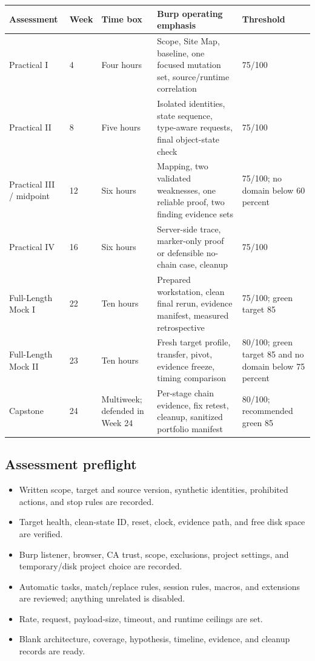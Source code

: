 \documentclass[11pt]{article}
\begin{document}
\begin{longtable}{@{}L{0.16\textwidth}C{0.08\textwidth}L{0.20\textwidth}L{0.27\textwidth}L{0.18\textwidth}@{}}
\toprule
\textbf{Assessment} & \textbf{Week} & \textbf{Time box} & \textbf{Burp operating emphasis} & \textbf{Threshold} \\
\midrule
\endhead
Practical I & 4 & Four hours & Scope, Site Map, baseline, one focused mutation set, source/runtime correlation & 75/100 \\
Practical II & 8 & Five hours & Isolated identities, state sequence, type-aware requests, final object-state check & 75/100 \\
Practical III / midpoint & 12 & Six hours & Mapping, two validated weaknesses, one reliable proof, two finding evidence sets & 75/100; no domain below 60 percent \\
Practical IV & 16 & Six hours & Server-side trace, marker-only proof or defensible no-chain case, cleanup & 75/100 \\
Full-Length Mock I & 22 & Ten hours & Prepared workstation, clean final rerun, evidence manifest, measured retrospective & 75/100; green target 85 \\
Full-Length Mock II & 23 & Ten hours & Fresh target profile, transfer, pivot, evidence freeze, timing comparison & 80/100; green target 85 and no domain below 75 percent \\
Capstone & 24 & Multiweek; defended in Week 24 & Per-stage chain evidence, fix retest, cleanup, sanitized portfolio manifest & 80/100; recommended green 85 \\
\bottomrule
\end{longtable}

\subsection{Assessment preflight}

\begin{checkpoints}[title=Thirty-minute operational preflight]
\begin{itemize}[label=$\square$]
  \item Written scope, target and source version, synthetic identities, prohibited actions, and stop rules are recorded.
  \item Target health, clean-state ID, reset, clock, evidence path, and free disk space are verified.
  \item Burp listener, browser, CA trust, scope, exclusions, project settings, and temporary/disk project choice are recorded.
  \item Automatic tasks, match/replace rules, session rules, macros, and extensions are reviewed; anything unrelated is disabled.
  \item Rate, request, payload-size, timeout, and runtime ceilings are set.
  \item Blank architecture, coverage, hypothesis, timeline, evidence, and cleanup records are ready.
\end{itemize}
\end{checkpoints}
\end{document}
